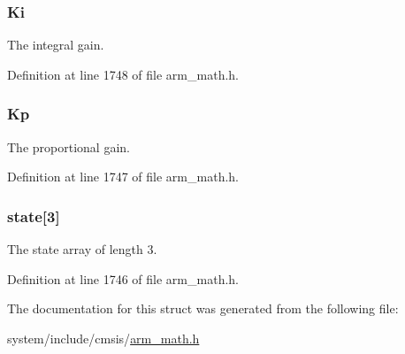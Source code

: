 \subsubsection[{\texorpdfstring{Ki}{Ki}}]{ Ki}\hypertarget{structarm__pid__instance__q15_a19d5059baf06dd52266260d096702d0a}{}\label{structarm__pid__instance__q15_a19d5059baf06dd52266260d096702d0a}
The integral gain. 

Definition at line 1748 of file arm\+\_\+math.\+h.

\subsubsection[{\texorpdfstring{Kp}{Kp}}]{ Kp}\hypertarget{structarm__pid__instance__q15_afef61fb3b64c73f2cd0c91d9dcf95679}{}\label{structarm__pid__instance__q15_afef61fb3b64c73f2cd0c91d9dcf95679}
The proportional gain. 

Definition at line 1747 of file arm\+\_\+math.\+h.

\subsubsection[{\texorpdfstring{state}{state}}]{ state\mbox{[}3\mbox{]}}\hypertarget{structarm__pid__instance__q15_a4c4e19d77015f5f7a31a1daf0faf31b6}{}\label{structarm__pid__instance__q15_a4c4e19d77015f5f7a31a1daf0faf31b6}
The state array of length 3. 

Definition at line 1746 of file arm\+\_\+math.\+h.



The documentation for this struct was generated from the following file\+:\begin{DoxyCompactItemize}
\item 
system/include/cmsis/\hyperlink{arm__math_8h}{arm\+\_\+math.\+h}\end{DoxyCompactItemize}
